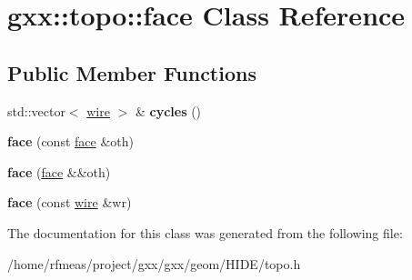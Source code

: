\hypertarget{classgxx_1_1topo_1_1face}{}\section{gxx\+:\+:topo\+:\+:face Class Reference}
\label{classgxx_1_1topo_1_1face}
\subsection*{Public Member Functions}
\begin{DoxyCompactItemize}
\item 
std\+::vector$<$ \hyperlink{classgxx_1_1topo_1_1wire}{wire} $>$ \& {\bfseries cycles} ()\hypertarget{classgxx_1_1topo_1_1face_adaf9128f6991657bfc8bf5336e94ccf6}{}\label{classgxx_1_1topo_1_1face_adaf9128f6991657bfc8bf5336e94ccf6}

\item 
{\bfseries face} (const \hyperlink{classgxx_1_1topo_1_1face}{face} \&oth)\hypertarget{classgxx_1_1topo_1_1face_aacb2c06eed2a95638e7fd4832aef3d26}{}\label{classgxx_1_1topo_1_1face_aacb2c06eed2a95638e7fd4832aef3d26}

\item 
{\bfseries face} (\hyperlink{classgxx_1_1topo_1_1face}{face} \&\&oth)\hypertarget{classgxx_1_1topo_1_1face_af52b4734d39859da056ca8c8e993980f}{}\label{classgxx_1_1topo_1_1face_af52b4734d39859da056ca8c8e993980f}

\item 
{\bfseries face} (const \hyperlink{classgxx_1_1topo_1_1wire}{wire} \&wr)\hypertarget{classgxx_1_1topo_1_1face_a9ec465261c4e59111f73fa7c5278a35d}{}\label{classgxx_1_1topo_1_1face_a9ec465261c4e59111f73fa7c5278a35d}

\end{DoxyCompactItemize}


The documentation for this class was generated from the following file\+:\begin{DoxyCompactItemize}
\item 
/home/rfmeas/project/gxx/gxx/geom/\+H\+I\+D\+E/topo.\+h\end{DoxyCompactItemize}
